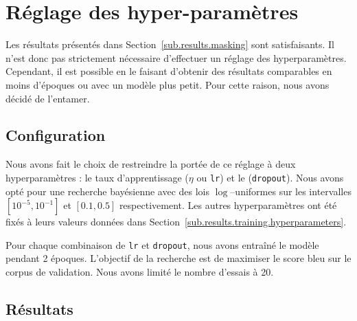 \section{Réglage des hyper-paramètres}%
\label{sec.results.hparams}

Les résultats présentés dans Section~\ref{sub.results.masking} sont satisfaisants.
Il n'est donc pas strictement nécessaire d'effectuer un réglage des hyperparamètres.
Cependant, il est possible en le faisant d'obtenir des résultats comparables 
en moins d'époques ou avec un modèle plus petit.
Pour cette raison, nous avons décidé de l'entamer.

\subsection{Configuration}%
\label{sub.results.hparams.config}

Nous avons fait le choix de restreindre la portée de ce réglage à deux hyperparamètres :
le taux d'apprentissage (\(\eta\) ou \verb|lr|) et le (\verb|dropout|).
Nous avons opté pour une recherche bayésienne avec des lois \(\log\)--uniformes sur les intervalles
\(\left[10^{-5}, 10^{-1}\right]\) et \([0.1, 0.5]\) respectivement.
Les autres hyperparamètres ont été fixés à leurs valeurs données dans Section~\ref{sub.results.training.hyperparameters}.

Pour chaque combinaison de \verb|lr| et \verb|dropout|, nous avons entraîné le modèle pendant 2 époques.
L'objectif de la recherche est de maximiser le score \gls{bleu} sur le corpus de validation.
Nous avons limité le nombre d'essais à 20.

\subsection{Résultats}%
\label{sub.results.hparams.results}

